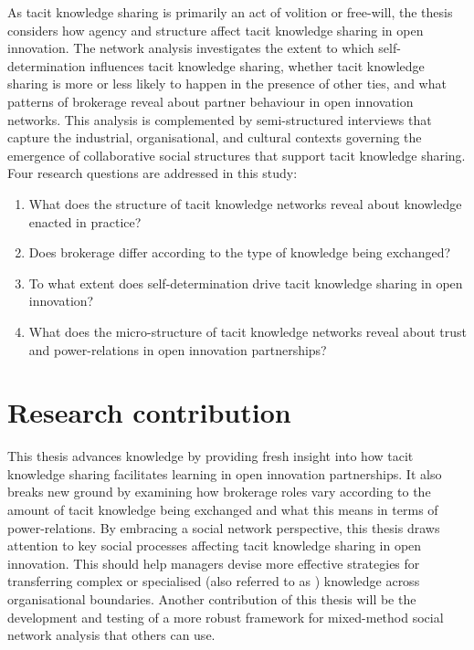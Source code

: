 As tacit knowledge sharing is primarily an act of volition or free-will, the thesis considers how agency and structure affect tacit knowledge sharing in open innovation. The network analysis investigates the extent to which self-determination influences tacit knowledge sharing, whether tacit knowledge sharing is more or less likely to happen in the presence of other ties, and what patterns of brokerage reveal about partner behaviour in open innovation networks. This analysis is complemented by semi-structured interviews that capture the industrial, organisational, and cultural contexts governing the emergence of collaborative social structures that support tacit knowledge sharing. Four research questions are addressed in this study: \medskip

\begin{enumerate}
\item What does the structure of tacit knowledge networks reveal about knowledge enacted in practice?
\item Does brokerage differ according to the type of knowledge being exchanged?
\item To what extent does self-determination drive tacit knowledge sharing in open innovation?
\item What does the micro-structure of tacit knowledge networks reveal about trust and power-relations in open innovation partnerships?
\end{enumerate}

\section{Research contribution}

This thesis advances knowledge by providing fresh insight into how tacit knowledge sharing facilitates learning in open innovation partnerships. It also breaks new ground by examining how brokerage roles vary according to the amount of tacit knowledge being exchanged and what this means in terms of power-relations. By embracing a social network perspective, this thesis draws attention to key social processes affecting tacit knowledge sharing in open innovation. This should help managers devise more effective strategies for transferring complex or specialised (also referred to as ) knowledge across organisational boundaries. Another contribution of this thesis will be the development and testing of a more robust framework for mixed-method social network analysis that others can use. 

